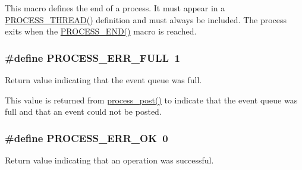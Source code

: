 This macro defines the end of a process. It must appear in a \hyperlink{group__process_gaa4cff8e4f3abc50c74619a90ae347200}{P\-R\-O\-C\-E\-S\-S\-\_\-\-T\-H\-R\-E\-A\-D()} definition and must always be included. The process exits when the \hyperlink{group__process_ga9c2681a0070eba8a7c9fdf4dbb6db05e}{P\-R\-O\-C\-E\-S\-S\-\_\-\-E\-N\-D()} macro is reached. \hypertarget{group__process_gaf73c4e16f7db2731761680c84e18bf37}{
\subsubsection[{P\-R\-O\-C\-E\-S\-S\-\_\-\-E\-R\-R\-\_\-\-F\-U\-L\-L}]{\setlength{\rightskip}{0pt plus 5cm}\#define P\-R\-O\-C\-E\-S\-S\-\_\-\-E\-R\-R\-\_\-\-F\-U\-L\-L~1}}\label{group__process_gaf73c4e16f7db2731761680c84e18bf37}


Return value indicating that the event queue was full. 

This value is returned from \hyperlink{group__process_gaaf5f03bb404a67415ea4ea72a749203f}{process\-\_\-post()} to indicate that the event queue was full and that an event could not be posted. \hypertarget{group__process_gab8b88e679094ca4b95deb8ee8320802b}{
\subsubsection[{P\-R\-O\-C\-E\-S\-S\-\_\-\-E\-R\-R\-\_\-\-O\-K}]{\setlength{\rightskip}{0pt plus 5cm}\#define P\-R\-O\-C\-E\-S\-S\-\_\-\-E\-R\-R\-\_\-\-O\-K~0}}\label{group__process_gab8b88e679094ca4b95deb8ee8320802b}


Return value indicating that an operation was successful. 

